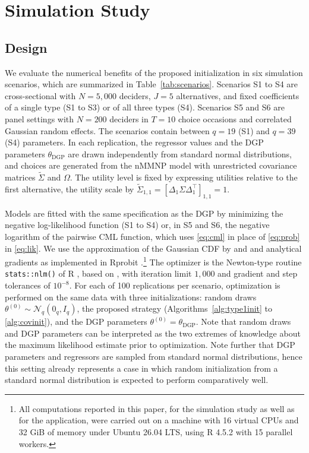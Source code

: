 \documentclass[preprint,12pt,authoryear]{elsarticle}
\newcommand{\Normal}[2]{\mathcal{N}_{#1}\left(#2 \right)}
\begin{document}
\section{Simulation Study}\label{sec:simulation}

\subsection{Design}

We evaluate the numerical benefits of the proposed initialization in six simulation scenarios, which are summarized in Table~\ref{tab:scenarios}. Scenarios S1 to S4 are cross-sectional with $N = 5{,}000$ deciders, $J = 5$ alternatives, and fixed coefficients of a single type (S1 to S3) or of all three types (S4). Scenarios S5 and S6 are panel settings with $N = 200$ deciders in $T = 10$ choice occasions and correlated Gaussian random effects.
The scenarios contain between $q=19$ (S1) and $q=39$ (S4) parameters.
In each replication, the regressor values and the DGP parameters $\theta_\text{DGP}$ are drawn independently from standard normal distributions, and choices are generated from the nMMNP model with unrestricted covariance matrices $\tilde{\Sigma}$ and $\Omega$. The utility level is fixed by expressing utilities relative to the first alternative, the utility scale by $\tilde{\Sigma}_{1,1} = [\Delta_1 \Sigma \Delta_1^\top]_{1,1} = 1$.

\begin{table}[htb]
    \centering
    \caption{Simulation scenarios.}
    \label{tab:scenarios}
    \resizebox{\textwidth}{!}{}
\end{table}

Models are fitted with the same specification as the DGP by minimizing the negative log-likelihood function (S1 to S4) or, in S5 and S6, the negative logarithm of the pairwise CML function, which uses \eqref{eq:cml} in place of \eqref{eq:prob} in \eqref{eq:lik}. We use the approximation of the Gaussian CDF by \citet{Solow1990} and \citet{Joe1995} and analytical gradients as implemented in Rprobit \citep{Rprobit}.\footnote{All computations reported in this paper, for the simulation study as well as for the application, were carried out on a machine with 16 virtual CPUs and 32 GiB of memory under Ubuntu 26.04 LTS, using R 4.5.2 with 15 parallel workers.} The optimizer is the Newton-type routine \texttt{stats::nlm()} of R \citep{R}, based on \citet{Dennis1983}, with iteration limit $1{,}000$ and gradient and step tolerances of $10^{-8}$. For each of 100 replications per scenario, optimization is performed on the same data with three initializations: random draws $\theta^{(0)} \sim \Normal{q}{0_q, I_q}$, the proposed strategy (Algorithms~\ref{alg:type1init} to \ref{alg:covinit}), and the DGP parameters $\theta^{(0)} = \theta_\text{DGP}$. Note that random draws and DGP parameters can be interpreted as the two extremes of knowledge about the maximum likelihood estimate prior to optimization. Note further that DGP parameters and regressors are sampled from standard normal distributions, hence this setting already represents a case in which random initialization from a standard normal distribution is expected to perform comparatively well.
\end{document}
